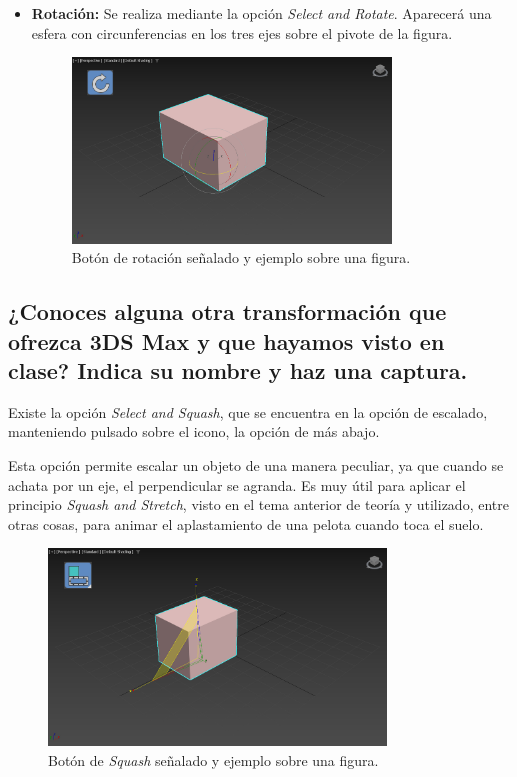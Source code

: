 \documentclass{article}
\begin{document}
\begin{itemize}
    \item \textbf{Rotación: }Se realiza mediante la opción \textit{Select and Rotate}. Aparecerá una esfera con circunferencias en los tres ejes sobre el pivote de la figura.
    
    \begin{figure}[H]
        \centering
        \includegraphics[width=0.8\textwidth]{imagenes/rot.jpg}
        \caption{Botón de rotación señalado y ejemplo sobre una figura.}
     \end{figure}    
\end{itemize}

\newpage

\subsection{¿Conoces alguna otra transformación que ofrezca 3DS Max y que hayamos visto en clase? Indica su nombre y haz una captura.}

Existe la opción \textit{Select and Squash}, que se encuentra en la opción de escalado, manteniendo pulsado sobre el icono, la opción de más abajo.

\bigskip

Esta opción permite escalar un objeto de una manera peculiar, ya que cuando se achata por un eje, el perpendicular se agranda. Es muy útil para aplicar el principio \textit{Squash and Stretch}, visto en el tema anterior de teoría y utilizado, entre otras cosas, para animar el aplastamiento de una pelota cuando toca el suelo.

\begin{figure}[H]
    \centering
    \includegraphics[width=0.8\textwidth]{imagenes/squash.jpg}
    \caption{Botón de \textit{Squash} señalado y ejemplo sobre una figura.}
 \end{figure} 
\end{document}
